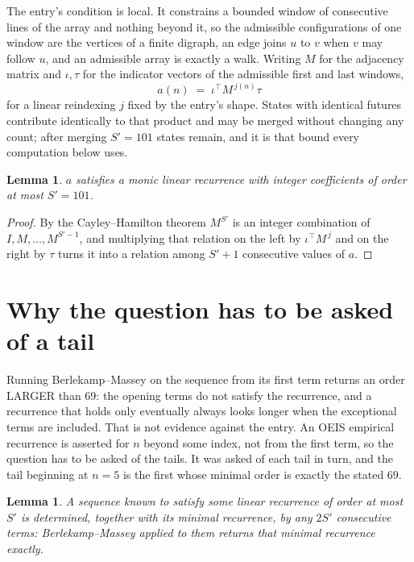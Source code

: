 \documentclass[11pt,a4paper]{article}
\theoremstyle{plain}
\newtheorem{lemma}[theorem]{Lemma}
\theoremstyle{definition}
\begin{document}
The entry's condition is local. It constrains a bounded window of consecutive lines of the
array and nothing beyond it, so the admissible configurations of one window are the vertices of
a finite digraph, an edge joins $u$ to $v$ when $v$ may follow $u$, and an admissible array is
exactly a walk. Writing $M$ for the adjacency matrix and $\iota,\tau$ for the indicator vectors
of the admissible first and last windows,
\[
a(n)\;=\;\iota^{\!\top}M^{\,j(n)}\tau
\]
for a linear reindexing $j$ fixed by the entry's shape. States with identical futures
contribute identically to that product and may be merged without changing any count; after
merging $S'=101$ states remain, and it is that bound every computation below uses.

\begin{lemma}\label{lem:cf}
$a$ satisfies a monic linear recurrence with integer coefficients of order at most $S'=101$.
\end{lemma}

\begin{proof}
By the Cayley--Hamilton theorem $M^{S'}$ is an integer combination of $I,M,\dots,M^{S'-1}$,
and multiplying that relation on the left by $\iota^{\!\top}M^{\,j}$ and on the right by
$\tau$ turns it into a relation among $S'+1$ consecutive values of $a$.
\end{proof}

\section{Why the question has to be asked of a tail}

Running Berlekamp--Massey on the sequence from its first term returns an order LARGER than $69$: the opening terms do not satisfy the recurrence, and a recurrence that holds only eventually always looks longer when the exceptional terms are included. That is not evidence against the entry. An OEIS empirical recurrence is asserted for $n$ beyond some index, not from the first term, so the question has to be asked of the tails. It was asked of each tail in turn, and the tail beginning at $n=5$ is the first whose minimal order is exactly the stated $69$.

\begin{lemma}\label{lem:bm}
A sequence known to satisfy some linear recurrence of order at most $S'$ is determined,
together with its minimal recurrence, by any $2S'$ consecutive terms: Berlekamp--Massey applied
to them returns that minimal recurrence exactly.
\end{lemma}
\end{document}
